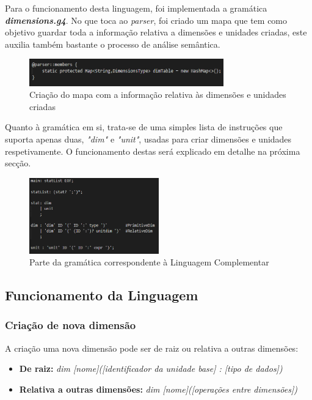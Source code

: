 \documentclass[10pt,portuguese]{article}
\begin{document}
\par Para o funcionamento desta linguagem, foi implementada a gramática \textbf{\textit{dimensions.g4}}. No que toca ao \textit{parser}, foi criado um mapa que tem como objetivo guardar toda a informação relativa a dimensões e unidades criadas, este auxilia também bastante o processo de análise semântica.
\begin{figure}[h]
\centering
\includegraphics[width=0.75\textwidth]{images/parserdimensions.png}
\caption{Criação do mapa com a informação relativa às dimensões e unidades criadas}
\end{figure}
\par Quanto à gramática em si, trata-se de uma simples lista de instruções que suporta apenas duas, \emph{"dim"} e \emph{"unit"}, usadas para criar dimensões e unidades respetivamente. O funcionamento destas será explicado em detalhe na próxima secção.
\par 
\begin{figure}[h]
\centering
\includegraphics[width=0.5\textwidth]{images/maindimensions.png}
\caption{Parte da gramática correspondente à Linguagem Complementar}
\end{figure}

\clearpage

\subsection{Funcionamento da Linguagem}

\subsubsection{Criação de nova dimensão}
\par A criação uma nova dimensão pode ser de raiz ou relativa a outras dimensões:

\begin{itemize}
    \item \textbf{De raiz:} \textit{dim [nome]([identificador da unidade base] : [tipo de dados])}
    \item \textbf{Relativa a outras dimensões:} \textit{dim [nome]([operações entre dimensões])}
\end{itemize}
\end{document}
